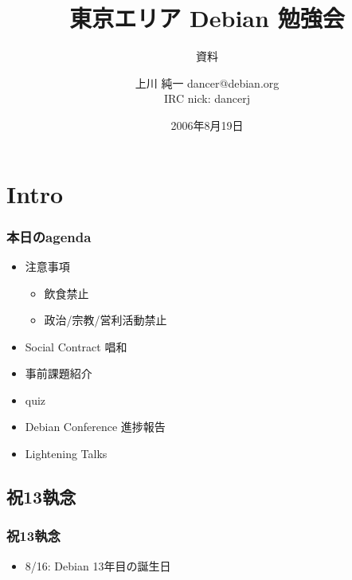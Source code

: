 \documentclass[cjk,dvipdfmx]{beamer}
\title{東京エリア Debian 勉強会}
\subtitle{資料}
\author{上川 純一 dancer@debian.org\\IRC nick: dancerj}
\date{2006年8月19日}
\begin{document}
\frame{\titlepage{}}

\section{Intro}
\begin{frame}
 \frametitle{本日のagenda}
\begin{itemize}
 \item 注意事項
       \begin{itemize}
	\item 飲食禁止
	\item 政治/宗教/営利活動禁止
       \end{itemize}
 \item Social Contract 唱和
 \item 事前課題紹介
 \item quiz
 \item Debian Conference 進捗報告
 \item Lightening Talks
\end{itemize}
\end{frame}

\subsection{祝13執念}
\begin{frame}
 \frametitle{祝13執念}
 \begin{itemize}
  \item 8/16: Debian 13年目の誕生日
 \end{itemize}
\end{frame}
\end{document}
